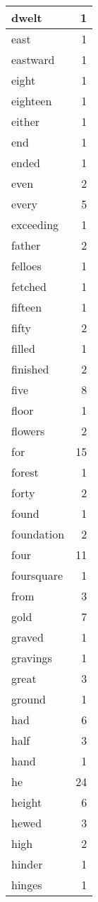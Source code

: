 \begin{center}
\begin{longtable}{l|r}
dwelt & 1 \\ \hline
east & 1 \\ \hline
eastward & 1 \\ \hline
eight & 1 \\ \hline
eighteen & 1 \\ \hline
either & 1 \\ \hline
end & 1 \\ \hline
ended & 1 \\ \hline
even & 2 \\ \hline
every & 5 \\ \hline
exceeding & 1 \\ \hline
father & 2 \\ \hline
felloes & 1 \\ \hline
fetched & 1 \\ \hline
fifteen & 1 \\ \hline
fifty & 2 \\ \hline
filled & 1 \\ \hline
finished & 2 \\ \hline
five & 8 \\ \hline
floor & 1 \\ \hline
flowers & 2 \\ \hline
for & 15 \\ \hline
forest & 1 \\ \hline
forty & 2 \\ \hline
found & 1 \\ \hline
foundation & 2 \\ \hline
four & 11 \\ \hline
foursquare & 1 \\ \hline
from & 3 \\ \hline
gold & 7 \\ \hline
graved & 1 \\ \hline
gravings & 1 \\ \hline
great & 3 \\ \hline
ground & 1 \\ \hline
had & 6 \\ \hline
half & 3 \\ \hline
hand & 1 \\ \hline
he & 24 \\ \hline
height & 6 \\ \hline
hewed & 3 \\ \hline
high & 2 \\ \hline
hinder & 1 \\ \hline
hinges & 1 \\ \hline

\end{longtable}
\end{center}
